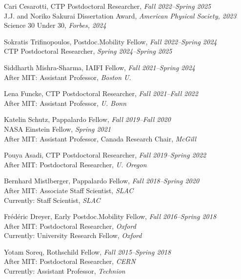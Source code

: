\bbl

\item Cari Cesarotti, CTP Postdoctoral Researcher, \emph{Fall 2022--Spring 2025}
\\ J.J. and Noriko Sakurai Dissertation Award, \emph{American Physical Society, 2023}
\\ Science 30 Under 30, \emph{Forbes, 2024}

\item Sokratis Trifinopoulos, Postdoc.Mobility Fellow, \emph{Fall 2022--Spring 2024}
\\ CTP Postdoctoral Researcher, \emph{Spring 2024--Spring 2025}

\item Siddharth Mishra-Sharma, IAIFI Fellow, \emph{Fall 2021--Spring 2024}
\\ After MIT: Assistant Professor, \emph{Boston U.}

\item Lena Funcke, CTP Postdoctoral Researcher, \emph{Fall 2021--Fall 2022}
\\ After MIT: Assistant Professor, \emph{U. Bonn}

\item Katelin Schutz, Pappalardo Fellow, \emph{Fall 2019--Fall 2020}
\\ NASA Einstein Fellow, \emph{Spring 2021}
\\ After MIT: Assistant Professor, Canada Research Chair, \emph{McGill}

\item Pouya Asadi, CTP Postdoctoral Researcher, \emph{Fall 2019--Spring 2022}
\\ After MIT: Postdoctoral Researcher, \emph{U. Oregon}

\item Bernhard Mistlberger, Pappalardo Fellow, \emph{Fall 2018--Spring 2020}
\\ After MIT: Associate Staff Scientist, \emph{SLAC}
\\ Currently: Staff Scientist, \emph{SLAC}

\item Frédéric Dreyer, Early Postdoc.Mobility Fellow, \emph{Fall 2016--Spring 2018}
\\ After MIT: Postdoctoral Researcher, \emph{Oxford}
\\ Currently: University Research Fellow, \emph{Oxford}

\item Yotam Soreq, Rothschild Fellow, \emph{Fall 2015--Spring 2018}
\\ After MIT: Postdoctoral Researcher, \emph{CERN}
\\ Currently: Assistant Professor, \emph{Technion}

